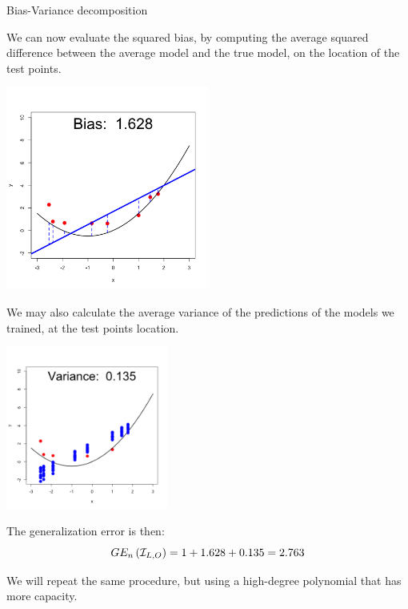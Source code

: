 \documentclass[11pt,compress,t,notes=noshow, xcolor=table]{beamer}
\begin{document}
\begin{vbframe} {Bias-Variance decomposition}
\framebreak

We can now evaluate the squared bias, by computing the average squared difference between the average model and the true model, on the location of the test points.

\begin{center}
  \includegraphics[width = 0.5\textwidth]{figure/bias_variance_decomposition-linear_model_bias.png}
\end{center}

\framebreak

We may also calculate the average variance of the predictions of the models we trained, at the test points location.

\begin{center}
  \includegraphics[width = 0.4\textwidth]{figure/bias_variance_decomposition-linear_model_variance.png}
\end{center}

The generalization error is then: 
$$GE_n\left(\mathcal{I}_{L, O}\right) = 1 + 1.628 + 0.135 = 2.763 $$


\framebreak

We will repeat the same procedure, but using a high-degree polynomial that has more capacity.


\end{vbframe}
\end{document}
